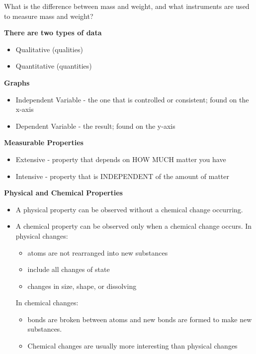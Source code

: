 \documentclass[../hchem.tex]{subfiles}
\begin{document}
\ex What is the difference between mass and weight, and what instruments are used to measure mass and weight?

\textbf{There are two types of data}
\begin{itemize}
    \item Qualitative (qualities)
    \item Quantitative (quantities)
\end{itemize}

\textbf{Graphs} 
\begin{itemize}
    \item Independent Variable - the one that is controlled or consistent; found on the x-axis 
    \item Dependent Variable - the result; found on the y-axis 
\end{itemize}

\textbf{Measurable Properties}
\begin{itemize}
    \item Extensive - property that depends on HOW MUCH matter you have 
    \item Intensive - property that is INDEPENDENT of the amount of matter 
\end{itemize}

\textbf{Physical and Chemical Properties}
\begin{itemize}
    \item A physical property can be observed without a chemical change occurring.
    \item A chemical property can be observed only when a chemical change occurs.
    In physical changes:
    \begin{itemize}
        \item atoms are not rearranged into new substances 
        \item include all changes of state 
        \item changes in size, shape, or dissolving 
    \end{itemize}

    In chemical changes:
    \begin{itemize}
        \item bonds are broken between atoms and new bonds are formed to make new substances.
        \item Chemical changes are usually more interesting than physical changes 
    \end{itemize}
\end{itemize}
\end{document}

